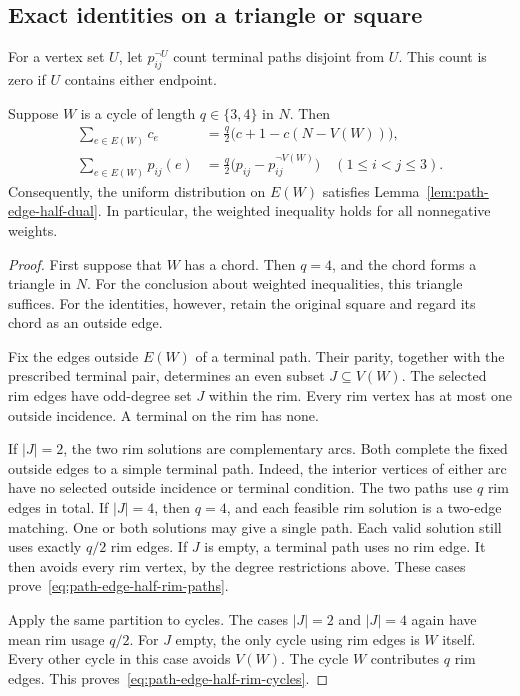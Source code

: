 \subsection{Exact identities on a triangle or square}

For a vertex set $U$, let $p_{ij}^{\neg U}$ count terminal paths disjoint from $U$.
This count is zero if $U$ contains either endpoint.

\begin{proposition}\label{prop:path-edge-half-short-rim}
Suppose $W$ is a cycle of length $q\in\{3,4\}$ in $N$.
Then
\begin{align}
 \sum_{e\in E(W)}c_e
 &=\frac q2\bigl(c+1-c(N-V(W))\bigr),\label{eq:path-edge-half-rim-cycles}\\
 \sum_{e\in E(W)}p_{ij}(e)
 &=\frac q2\bigl(p_{ij}-p_{ij}^{\neg V(W)}\bigr)
 \quad(1\le i<j\le3).\label{eq:path-edge-half-rim-paths}
\end{align}
Consequently, the uniform distribution on $E(W)$ satisfies Lemma~\ref{lem:path-edge-half-dual}.
In particular, the weighted inequality holds for all nonnegative weights.
\end{proposition}

\begin{proof}
First suppose that $W$ has a chord.
Then $q=4$, and the chord forms a triangle in $N$.
For the conclusion about weighted inequalities, this triangle suffices.
For the identities, however, retain the original square and regard its chord as an outside edge.

Fix the edges outside $E(W)$ of a terminal path.
Their parity, together with the prescribed terminal pair, determines an even subset $J\subseteq V(W)$.
The selected rim edges have odd-degree set $J$ within the rim.
Every rim vertex has at most one outside incidence.
A terminal on the rim has none.

If $|J|=2$, the two rim solutions are complementary arcs.
Both complete the fixed outside edges to a simple terminal path.
Indeed, the interior vertices of either arc have no selected outside incidence or terminal condition.
The two paths use $q$ rim edges in total.
If $|J|=4$, then $q=4$, and each feasible rim solution is a two-edge matching.
One or both solutions may give a single path.
Each valid solution still uses exactly $q/2$ rim edges.
If $J$ is empty, a terminal path uses no rim edge.
It then avoids every rim vertex, by the degree restrictions above.
These cases prove~\eqref{eq:path-edge-half-rim-paths}.

Apply the same partition to cycles.
The cases $|J|=2$ and $|J|=4$ again have mean rim usage $q/2$.
For $J$ empty, the only cycle using rim edges is $W$ itself.
Every other cycle in this case avoids $V(W)$.
The cycle $W$ contributes $q$ rim edges.
This proves~\eqref{eq:path-edge-half-rim-cycles}.
\end{proof}

